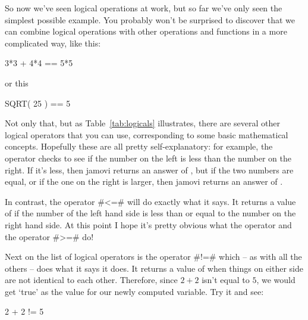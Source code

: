
So now we've seen logical operations at work, but so far we've only seen the simplest possible example. You probably won't be surprised to discover that we can combine logical operations with other operations and functions in a more complicated way, like this:

\begin{rblock1}
3*3 + 4*4 == 5*5
\end{rblock1} 

or this

\begin{rblock1}
SQRT( 25 ) == 5
\end{rblock1}

Not only that, but as Table~\ref{tab:logicals} illustrates, there are several other logical operators that you can use, corresponding to some basic mathematical concepts. Hopefully these are all pretty self-explanatory: for example, the  operator \rtext{<} checks to see if the number on the left is less than the number on the right. If it's less, then jamovi returns an answer of , but if the two numbers are equal, or if the one on the right is larger, then jamovi returns an answer of .

In contrast, the  operator \rtextverb#<=# will do exactly what it says. It returns a value of  if the number of the left hand side is less than or equal to the number on the right hand side. At this point I hope it's pretty obvious what the  operator \rtext{>} and the  operator \rtextverb#>=# do! 

Next on the list of logical operators is the  operator \rtextverb#!=# which -- as with all the others -- does what it says it does. It returns a value of  when things on either side are not identical to each other. Therefore, since $2+2$ isn't equal to $5$, we would get `true' as the value for our newly computed variable. Try it and see:

\begin{rblock1}
2 + 2 != 5
\end{rblock1}


